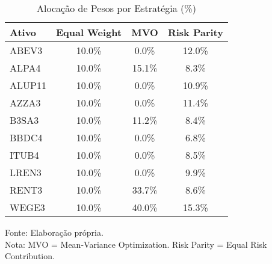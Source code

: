 \begin{table}[htbp]
\centering
\caption{Alocação de Pesos por Estratégia (\%)}
\label{tab:pesos_portfolios}
\begin{tabular}{|l|c|c|c|}
\hline
\textbf{Ativo} & \textbf{Equal Weight} & \textbf{MVO} & \textbf{Risk Parity} \\
\hline
ABEV3 & 10.0\% & 0.0\% & 12.0\% \\
ALPA4 & 10.0\% & 15.1\% & 8.3\% \\
ALUP11 & 10.0\% & 0.0\% & 10.9\% \\
AZZA3 & 10.0\% & 0.0\% & 11.4\% \\
B3SA3 & 10.0\% & 11.2\% & 8.4\% \\
BBDC4 & 10.0\% & 0.0\% & 6.8\% \\
ITUB4 & 10.0\% & 0.0\% & 8.5\% \\
LREN3 & 10.0\% & 0.0\% & 9.9\% \\
RENT3 & 10.0\% & 33.7\% & 8.6\% \\
WEGE3 & 10.0\% & 40.0\% & 15.3\% \\
\hline
\end{tabular}
\footnotesize
Fonte: Elaboração própria.\\
Nota: MVO = Mean-Variance Optimization. Risk Parity = Equal Risk Contribution.
\end{table}
